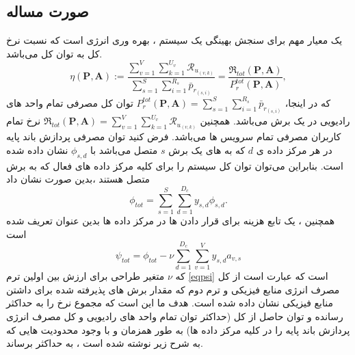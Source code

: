 \subsection{صورت مساله}
یک معیار مهم برای سنجش بهینگی یک سیستم ، بهره وری انرژی است که نسبت نرخ کل به توان کل می‌باشد.
\begin{equation}
\textstyle \eta(\boldsymbol{P},\boldsymbol{A}) := \frac{\sum\limits_{v=1}^{V} \sum\limits_{k=1}^{{U}_v}\mathcal{R}_{u_{(v,k)}} }{\sum\limits_{s=1}^{S} \sum\limits_{i=1}^{{R}_s}\bar{p}_{r_{(s,i)}}} = \frac{\mathfrak{R}_{tot}(\boldsymbol{P},\boldsymbol{A})}{P_r^{{tot}}(\boldsymbol{P},\boldsymbol{A})},
\end{equation}
که در اینجا، 
 $P_r^{tot}(\boldsymbol{P},\boldsymbol{A}) = \sum\limits_{s=1}^{S}\sum\limits_{i=1}^{{R}_s}\bar{p}_{r_{(s,i)}}$
 توان کل مصرفی تمام واحد های رادیویی در یک برش می‌باشد.
همچنین 
 $\mathfrak{R}_{tot}(\boldsymbol{P},\boldsymbol{A}) = \sum\limits_{v=1}^{V} \sum\limits_{k=1}^{{U}_v}\mathcal{R}_{u_{(v,k)}} $
 نرخ تمام کاربران مصرفی تمام سرویس ها می‌باشد.
فرض کنید توان مصرفی پردازش باند پایه در هر مرکز داده ی $d$ که به  های یک برش $s$ متصل می‌باشد با   
$\phi_{s,d}$
نشان داده شده است.
بنابراین می‌توان توان کل سیستم را برای کلیه مرکز داده های فعال که به برش متصل هستند ،بدین صورت نشان داد
\begin{equation*}
\textstyle \phi_{tot} = \sum_{s=1}^{S}\sum_{d=1}^{D_c}y_{s,d}\phi_{s,d}.
\end{equation*}
همچنین ، یک تابع هزینه برای قرار دادن  ها در مرکز داده ها بدین عنوان تعریف شده است
\begin{equation}\label{eqpsi}
\textstyle  \psi_{tot} = \phi_{tot} - \nu \sum_{d=1}^{D_c}\sum_{v=1}^{V}y_{s,d}a_{v,s}
\end{equation}
که $\nu$
متغیر طراحی برای ارزش بین اولین ترم 
\eqref{eqpsi}
 است که عبارت است از کل مصرف انرژی منابع فیزیکی و ترم دوم که مقدار برش های پذیرفته شده برای داشتن منابع فیزیکی نشان داده شده است.
هدف ما این است که مجموع نرخ را به حداکثر رسانده و توان حاصل از کل (حداکثر توان تمام واحد های رادیویی و کل مصرف انرژی پردازش باند پایه را در کلیه مرکز داده ها) به طور همزمان و با وجود محدودیت هایی که به شرح زیر نوشته شده است ، به حداکثر برساند.
